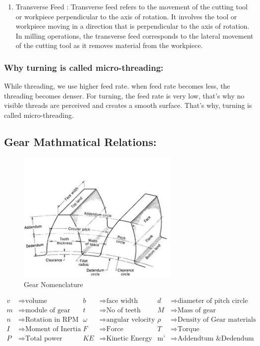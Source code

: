 \documentclass{article}
\begin{document}
\begin{enumerate}
\begin{enumerate}
      \item Transverse Feed : Transverse feed refers to the movement of the cutting tool or workpiece perpendicular to the axis of rotation. It involves the tool or workpiece moving in a direction that is perpendicular to the axis of rotation. In milling operations, the transverse feed corresponds to the lateral movement of the cutting tool as it removes material from the workpiece.
    \end{enumerate}
\end{enumerate}

\subsubsection*{Why turning is called micro-threading:}
While threading, we use higher feed rate. when feed rate becomes less, the threading becomes denser. For turning, the feed rate is very low, that's why no visible threads are perceived and creates a smooth surface. That's why, turning is called micro-threading. 

\subsection*{Gear Mathmatical Relations:}
\begin{figure}
  \centering
  \includegraphics*[width=0.7\textwidth]{img/gear_nomen.png}
  \caption{Gear Nomenclature}
\end{figure}

\begin{align*}
  v &\Rightarrow \text{volume} &
  b &\Rightarrow \text{face width} &
  d &\Rightarrow \text{diameter of pitch circle} \\
  m &\Rightarrow \text{module of gear} & 
  t &\Rightarrow \text{No of teeth} &
  M &\Rightarrow \text{Mass of gear} \\ 
  n &\Rightarrow \text{Rotation in RPM} & 
  \omega &\Rightarrow \text{angular velocity} &
  \rho &\Rightarrow \text{Density of Gear materials} \\ 
  I &\Rightarrow \text{Moment of Inertia} & 
  F &\Rightarrow \text{Force} &
  T &\Rightarrow \text{Torque} \\
  P &\Rightarrow \text{Total power} &
  KE &\Rightarrow \text{Kinetic Energy} & 
  \text{m'} &\Rightarrow \text{Addendtum \& Dedendum} 
\end{align*}
\end{document}
